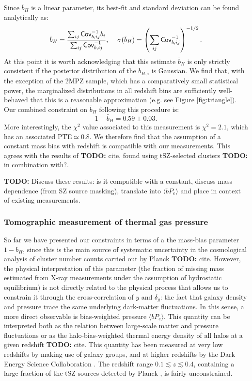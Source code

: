\documentclass[useAMS,usenatbib]{mn2e}
\newcommand{\TODO}[1]{{\bf TODO:} #1}
\newcommand{\todo}[1]{{\bf TODO:} #1}
\begin{document}
      Since $\bar{b}_H$ is a linear parameter, its best-fit and standard deviation can be found analytically as:
      \begin{equation}
        \bar{b}_H=\frac{\sum_{ij}{\sf Cov}_{b,ij}^{-1}b_i}{\sum_{ij}{\sf Cov}^{-1}_{b,ij}},
        \hspace{12pt}
        \sigma(\bar{b}_H)=\left(\sum_{ij}{\sf Cov}^{-1}_{b,ij}\right)^{-1/2}.
      \end{equation}
      At this point it is worth acknowledging that this estimate $\bar{b}_H$ is only strictly consistent if the posterior distribution of the $b_{H,i}$ is Gaussian. We find that, with the exception of the 2MPZ sample, which has a comparatively small statistical power, the marginalized distributions in all redshift bins are sufficiently well-behaved that this is a reasonable approximation (e.g. see Figure \ref{fig:triangle}). Our combined constraint on $\bar{b}_H$ following this procedure is:
      \begin{equation}
        1-\bar{b}_H=0.59\pm0.03.
      \end{equation}
      More interestingly, the $\chi^2$ value associated to this measurement is $\chi^2=2.1$, which has an associated PTE$\simeq0.8$. We therefore find that the assumption of a constant mass bias with redshift is compatible with our measurements. This agrees with the results of \todo{cite}, found using tSZ-selected clusters \todo{in combination with?}.

      \TODO{Discuss these results: is it compatible with a constant, discuss mass dependence (from SZ source masking), translate into $\langle bP_e \rangle$ and place in context of existing measurements.}

    \subsubsection{Tomographic measurement of thermal gas pressure}\label{ssec:results.fid.bpe}
      So far we have presented our constraints in terms of a the mass-bias parameter $1-b_H$, since this is the main source of systematic uncertainty in the cosmological analysis of cluster number counts carried out by Planck \todo{cite}. However, the physical interpretation of this parameter (the fraction of missing mass estimated from X-ray measurements under the assumption of hydrostatic equilibrium) is not directly related to the physical process that allows us to constrain it through the cross-correlation of $y$ and $\delta_g$: the fact that galaxy density and pressure trace the same underlying dark-matter fluctuations. In this sense, a more direct observable is bias-weighted pressure $\langle bP_e\rangle$. This quantity can be interpreted both as the relation between large-scale matter and pressure fluctuations or as the halo-bias-weighted thermal energy density of all halos at a given redshift \todo{cite}. This quantity has been measured at very low redshifts by \cite{2017MNRAS.467.2315V} making use of galaxy groups, and at higher redshifts by the Dark Energy Science Collaboration \cite{2019arXiv190413347P}. The redshift range $0.1\lesssim z\lesssim0.4$, containing a large fraction of the tSZ sources detected by Planck \citep{2016A&A...594A..27P}, is fairly unconstrained.
\end{document}
